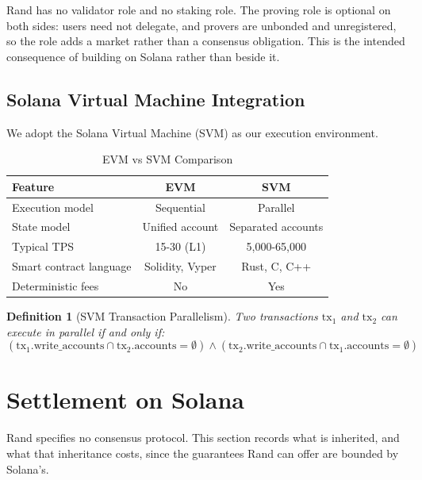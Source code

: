 \documentclass[11pt,a4paper]{article}
\newtheorem{definition}[theorem]{Definition}
\begin{document}
Rand has no validator role and no staking role. The proving role is optional on both sides: users need not delegate, and provers are unbonded and unregistered, so the role adds a market rather than a consensus obligation. This is the intended consequence of building on Solana rather than beside it.

\subsection{Solana Virtual Machine Integration}

We adopt the Solana Virtual Machine (SVM) \cite{Yakovenko2018} as our execution environment.

\begin{table}[H]
\centering
\caption{EVM vs SVM Comparison}
\begin{tabular}{@{}lcc@{}}
\toprule
\textbf{Feature} & \textbf{EVM} & \textbf{SVM} \\ \midrule
Execution model & Sequential & Parallel \\
State model & Unified account & Separated accounts \\
Typical TPS & 15-30 (L1) & 5,000-65,000 \\
Smart contract language & Solidity, Vyper & Rust, C, C++ \\
Deterministic fees & No & Yes \\ \bottomrule
\end{tabular}
\end{table}

\begin{definition}[SVM Transaction Parallelism]
Two transactions $\text{tx}_1$ and $\text{tx}_2$ can execute in parallel if and only if:
\begin{equation}
(\text{tx}_1.\text{write\_accounts} \cap \text{tx}_2.\text{accounts} = \emptyset) \land (\text{tx}_2.\text{write\_accounts} \cap \text{tx}_1.\text{accounts} = \emptyset)
\end{equation}
\end{definition}

\section{Settlement on Solana}
\label{sec:settlement}

Rand specifies no consensus protocol. This section records what is inherited, and what that inheritance costs, since the guarantees Rand can offer are bounded by Solana's.
\end{document}
